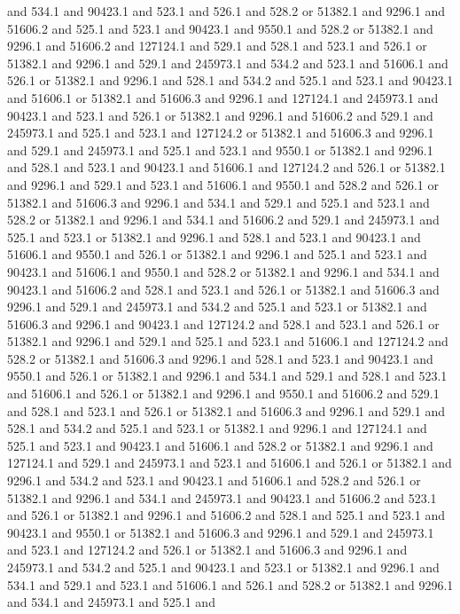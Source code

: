 and 534.1 and 90423.1 and 523.1 and 526.1 and 528.2 or 51382.1 and
9296.1 and 51606.2 and 525.1 and 523.1 and 90423.1 and 9550.1 and
528.2 or 51382.1 and 9296.1 and 51606.2 and 127124.1 and 529.1 and
528.1 and 523.1 and 526.1 or 51382.1 and 9296.1 and 529.1 and 245973.1
and 534.2 and 523.1 and 51606.1 and 526.1 or 51382.1 and 9296.1 and
528.1 and 534.2 and 525.1 and 523.1 and 90423.1 and 51606.1 or 51382.1
and 51606.3 and 9296.1 and 127124.1 and 245973.1 and 90423.1 and 523.1
and 526.1 or 51382.1 and 9296.1 and 51606.2 and 529.1 and 245973.1 and
525.1 and 523.1 and 127124.2 or 51382.1 and 51606.3 and 9296.1 and
529.1 and 245973.1 and 525.1 and 523.1 and 9550.1 or 51382.1 and
9296.1 and 528.1 and 523.1 and 90423.1 and 51606.1 and 127124.2 and
526.1 or 51382.1 and 9296.1 and 529.1 and 523.1 and 51606.1 and 9550.1
and 528.2 and 526.1 or 51382.1 and 51606.3 and 9296.1 and 534.1 and
529.1 and 525.1 and 523.1 and 528.2 or 51382.1 and 9296.1 and 534.1
and 51606.2 and 529.1 and 245973.1 and 525.1 and 523.1 or 51382.1 and
9296.1 and 528.1 and 523.1 and 90423.1 and 51606.1 and 9550.1 and
526.1 or 51382.1 and 9296.1 and 525.1 and 523.1 and 90423.1 and
51606.1 and 9550.1 and 528.2 or 51382.1 and 9296.1 and 534.1 and
90423.1 and 51606.2 and 528.1 and 523.1 and 526.1 or 51382.1 and
51606.3 and 9296.1 and 529.1 and 245973.1 and 534.2 and 525.1 and
523.1 or 51382.1 and 51606.3 and 9296.1 and 90423.1 and 127124.2 and
528.1 and 523.1 and 526.1 or 51382.1 and 9296.1 and 529.1 and 525.1
and 523.1 and 51606.1 and 127124.2 and 528.2 or 51382.1 and 51606.3
and 9296.1 and 528.1 and 523.1 and 90423.1 and 9550.1 and 526.1 or
51382.1 and 9296.1 and 534.1 and 529.1 and 528.1 and 523.1 and 51606.1
and 526.1 or 51382.1 and 9296.1 and 9550.1 and 51606.2 and 529.1 and
528.1 and 523.1 and 526.1 or 51382.1 and 51606.3 and 9296.1 and 529.1
and 528.1 and 534.2 and 525.1 and 523.1 or 51382.1 and 9296.1 and
127124.1 and 525.1 and 523.1 and 90423.1 and 51606.1 and 528.2 or
51382.1 and 9296.1 and 127124.1 and 529.1 and 245973.1 and 523.1 and
51606.1 and 526.1 or 51382.1 and 9296.1 and 534.2 and 523.1 and
90423.1 and 51606.1 and 528.2 and 526.1 or 51382.1 and 9296.1 and
534.1 and 245973.1 and 90423.1 and 51606.2 and 523.1 and 526.1 or
51382.1 and 9296.1 and 51606.2 and 528.1 and 525.1 and 523.1 and
90423.1 and 9550.1 or 51382.1 and 51606.3 and 9296.1 and 529.1 and
245973.1 and 523.1 and 127124.2 and 526.1 or 51382.1 and 51606.3 and
9296.1 and 245973.1 and 534.2 and 525.1 and 90423.1 and 523.1 or
51382.1 and 9296.1 and 534.1 and 529.1 and 523.1 and 51606.1 and 526.1
and 528.2 or 51382.1 and 9296.1 and 534.1 and 245973.1 and 525.1 and
